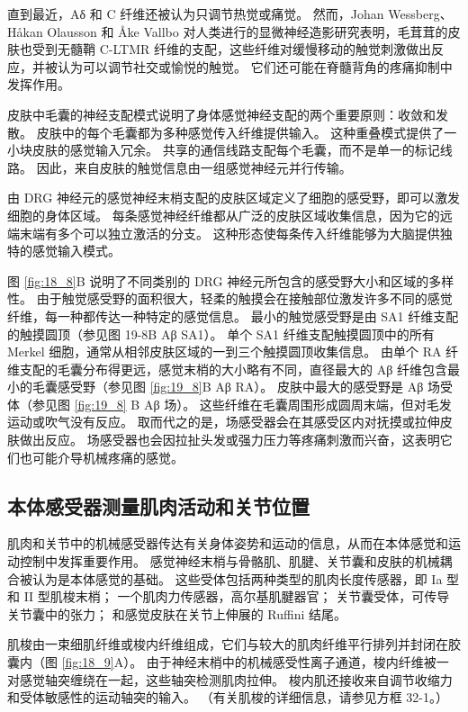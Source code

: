 直到最近，Aδ 和 C 纤维还被认为只调节热觉或痛觉。 
然而，Johan Wessberg、Håkan Olausson 和 Åke Vallbo 对人类进行的显微神经造影研究表明，毛茸茸的皮肤也受到无髓鞘 C-LTMR 纤维的支配，这些纤维对缓慢移动的触觉刺激做出反应，并被认为可以调节社交或愉悦的触觉。 
它们还可能在脊髓背角的疼痛抑制中发挥作用。


皮肤中毛囊的神经支配模式说明了身体感觉神经支配的两个重要原则：收敛和发散。 
皮肤中的每个毛囊都为多种感觉传入纤维提供输入。 
这种重叠模式提供了一小块皮肤的感觉输入冗余。 
共享的通信线路支配每个毛囊，而不是单一的标记线路。 
因此，来自皮肤的触觉信息由一组感觉神经元并行传输。


由 DRG 神经元的感觉神经末梢支配的皮肤区域定义了细胞的感受野，即可以激发细胞的身体区域。 
每条感觉神经纤维都从广泛的皮肤区域收集信息，因为它的远端末端有多个可以独立激活的分支。 
这种形态使每条传入纤维能够为大脑提供独特的感觉输入模式。


图 \ref{fig:18_8}B 说明了不同类别的 DRG 神经元所包含的感受野大小和区域的多样性。 
由于触觉感受野的面积很大，轻柔的触摸会在接触部位激发许多不同的感觉纤维，每一种都传达一种特定的感觉信息。 
最小的触觉感受野是由 SA1 纤维支配的触摸圆顶（参见图 19-8B Aβ SA1）。 
单个 SA1 纤维支配触摸圆顶中的所有 Merkel 细胞，通常从相邻皮肤区域的一到三个触摸圆顶收集信息。 
由单个 RA 纤维支配的毛囊分布得更远，感觉末梢的大小略有不同，直径最大的 Aβ 纤维包含最小的毛囊感受野（参见图 \ref{fig:19_8}B Aβ RA）。 
皮肤中最大的感受野是 Aβ 场受体（参见图 \ref{fig:19_8} B Aβ 场）。 
这些纤维在毛囊周围形成圆周末端，但对毛发运动或吹气没有反应。 
取而代之的是，场感受器会在其感受区内对抚摸或拉伸皮肤做出反应。 
场感受器也会因拉扯头发或强力压力等疼痛刺激而兴奋，这表明它们也可能介导机械疼痛的感觉。


\subsection{本体感受器测量肌肉活动和关节位置}
肌肉和关节中的机械感受器传达有关身体姿势和运动的信息，从而在本体感觉和运动控制中发挥重要作用。 
感觉神经末梢与骨骼肌、肌腱、关节囊和皮肤的机械耦合被认为是本体感觉的基础。 
这些受体包括两种类型的肌肉长度传感器，即 Ia 型和 II 型肌梭末梢； 一个肌肉力传感器，高尔基肌腱器官； 关节囊受体，可传导关节囊中的张力； 和感觉皮肤在关节上伸展的 Ruffini 结尾。


肌梭由一束细肌纤维或梭内纤维组成，它们与较大的肌肉纤维平行排列并封闭在胶囊内（图 \ref{fig:18_9}A）。 
由于神经末梢中的机械感受性离子通道，梭内纤维被一对感觉轴突缠绕在一起，这些轴突检测肌肉拉伸。 
梭内肌还接收来自调节收缩力和受体敏感性的运动轴突的输入。 
（有关肌梭的详细信息，请参见方框 32-1。）


